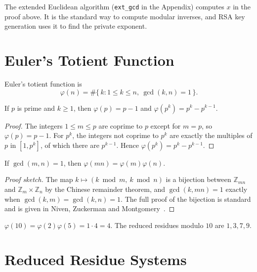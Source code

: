 \begin{remark}
The extended Euclidean algorithm (\texttt{ext\_gcd} in the Appendix) computes $x$ in the proof above. It is the standard way to compute modular inverses, and RSA key generation uses it to find the private exponent.
\end{remark}

\section{Euler's Totient Function}

\begin{definition}
Euler's totient function is
\[
  \varphi(n)=\#\{\,k : 1\le k\le n,\ \gcd(k,n)=1\,\}.
\]
\end{definition}

\begin{proposition}\label{prop:phi-prime}
If $p$ is prime and $k\ge 1$, then $\varphi(p)=p-1$ and $\varphi(p^k)=p^k-p^{k-1}$.
\end{proposition}

\begin{proof}
The integers $1\le m\le p$ are coprime to $p$ except for $m=p$, so $\varphi(p)=p-1$. For $p^k$, the integers not coprime to $p^k$ are exactly the multiples of $p$ in $[1,p^k]$, of which there are $p^{k-1}$. Hence $\varphi(p^k)=p^k-p^{k-1}$.
\end{proof}

\begin{proposition}\label{prop:phi-mult}
If $\gcd(m,n)=1$, then $\varphi(mn)=\varphi(m)\varphi(n)$.
\end{proposition}

\begin{proof}[Proof sketch]
The map $k\mapsto (k \bmod m,\ k\bmod n)$ is a bijection between $\mathbb{Z}_{mn}$ and $\mathbb{Z}_m\times\mathbb{Z}_n$ by the Chinese remainder theorem, and $\gcd(k,mn)=1$ exactly when $\gcd(k,m)=\gcd(k,n)=1$. The full proof of the bijection is standard and is given in Niven, Zuckerman and Montgomery~\cite{niven1991}.
\end{proof}

\begin{example}
$\varphi(10)=\varphi(2)\varphi(5)=1\cdot 4=4$. The reduced residues modulo $10$ are $1,3,7,9$.
\end{example}

\section{Reduced Residue Systems}

